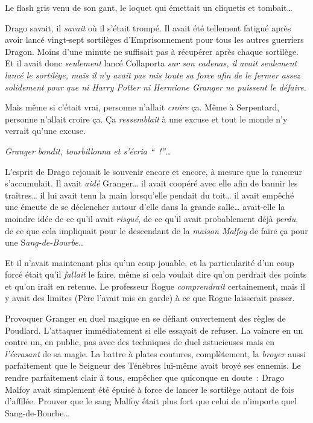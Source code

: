 Le flash gris venu de son gant, le loquet qui émettait un cliquetis et tombait…

Drago savait, il \emph{savait} où il s'était trompé.
Il avait été tellement fatigué après avoir lancé vingt-sept sortilèges d'Emprisonnement pour tous les autres guerriers Dragon.
Moins d'une minute ne suffisait pas à récupérer après chaque sortilège.
Et il avait donc \emph{seulement} lancé Collaporta \emph{sur son cadenas, il avait seulement lancé le sortilège, mais il n'y avait pas mis toute sa force afin de le fermer assez solidement pour que ni Harry Potter ni Hermione Granger ne puissent le défaire.}

Mais même si c'était vrai, personne n'allait \emph{croire} ça.
Même à Serpentard, personne n'allait croire ça.
Ça \emph{ressemblait} à une excuse et tout le monde n'y verrait qu'une excuse.

\emph{Granger bondit, tourbillonna et s'écria “~!”…}

L'esprit de Drago rejouait le souvenir encore et encore, à mesure que la rancœur s'accumulait.
Il avait \emph{aidé} Granger… il avait coopéré avec elle afin de bannir les traîtres… il lui avait tenu la main lorsqu'elle pendait du toit… il avait empêché une émeute de se déclencher autour d'elle dans la grande salle… avait-elle la moindre idée de ce qu'il avait \emph{risqué}, de ce qu'il avait probablement déjà \emph{perdu}, de ce que cela impliquait pour le descendant de la \emph{maison Malfoy} de faire ça pour une S\emph{ang-de-Bourbe}…

Et il n'avait maintenant plus qu'un coup jouable, et la particularité d'un coup forcé était qu'il \emph{fallait} le faire, même si cela voulait dire qu'on perdrait des points et qu'on irait en retenue.
Le professeur Rogue \emph{comprendrait} certainement, mais il y avait des limites (Père l'avait mis en garde) à ce que Rogue laisserait passer.

Provoquer Granger en duel magique en se défiant ouvertement des règles de Poudlard.
L'attaquer immédiatement si elle essayait de refuser.
La vaincre en un contre un, en public, pas avec des techniques de duel astucieuses mais en \emph{l'écrasant} de sa magie.
La battre à plates coutures, complètement, la \emph{broyer} aussi parfaitement que le Seigneur des Ténèbres lui-même avait broyé ses ennemis.
Le rendre parfaitement clair à tous, empêcher que quiconque en doute~: Drago Malfoy avait simplement été épuisé à force de lancer le sortilège autant de fois d'affilée.
Prouver que le sang Malfoy était plus fort que celui de n'importe quel Sang-de-Bourbe…

